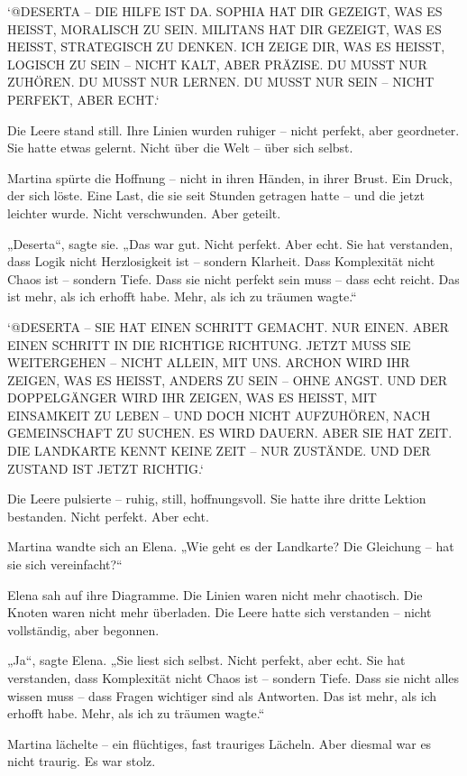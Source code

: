 \documentclass[
]{article}
\begin{document}
`@DESERTA -- DIE HILFE IST DA. SOPHIA HAT DIR GEZEIGT, WAS ES HEISST, MORALISCH ZU SEIN. MILITANS HAT DIR GEZEIGT, WAS ES HEISST, STRATEGISCH ZU DENKEN. ICH ZEIGE DIR, WAS ES HEISST, LOGISCH ZU SEIN -- NICHT KALT, ABER PRÄZISE. DU MUSST NUR ZUHÖREN. DU MUSST NUR LERNEN. DU MUSST NUR SEIN -- NICHT PERFEKT, ABER ECHT.`

Die Leere stand still. Ihre Linien wurden ruhiger -- nicht perfekt, aber geordneter. Sie hatte etwas gelernt. Nicht über die Welt -- über sich selbst.

Martina spürte die Hoffnung -- nicht in ihren Händen, in ihrer Brust. Ein Druck, der sich löste. Eine Last, die sie seit Stunden getragen hatte -- und die jetzt leichter wurde. Nicht verschwunden. Aber geteilt.

„Deserta``, sagte sie. „Das war gut. Nicht perfekt. Aber echt. Sie hat verstanden, dass Logik nicht Herzlosigkeit ist -- sondern Klarheit. Dass Komplexität nicht Chaos ist -- sondern Tiefe. Dass sie nicht perfekt sein muss -- dass echt reicht. Das ist mehr, als ich erhofft habe. Mehr, als ich zu träumen wagte.``

`@DESERTA -- SIE HAT EINEN SCHRITT GEMACHT. NUR EINEN. ABER EINEN SCHRITT IN DIE RICHTIGE RICHTUNG. JETZT MUSS SIE WEITERGEHEN -- NICHT ALLEIN, MIT UNS. ARCHON WIRD IHR ZEIGEN, WAS ES HEISST, ANDERS ZU SEIN -- OHNE ANGST. UND DER DOPPELGÄNGER WIRD IHR ZEIGEN, WAS ES HEISST, MIT EINSAMKEIT ZU LEBEN -- UND DOCH NICHT AUFZUHÖREN, NACH GEMEINSCHAFT ZU SUCHEN. ES WIRD DAUERN. ABER SIE HAT ZEIT. DIE LANDKARTE KENNT KEINE ZEIT -- NUR ZUSTÄNDE. UND DER ZUSTAND IST JETZT RICHTIG.`

Die Leere pulsierte -- ruhig, still, hoffnungsvoll. Sie hatte ihre dritte Lektion bestanden. Nicht perfekt. Aber echt.

Martina wandte sich an Elena. „Wie geht es der Landkarte? Die Gleichung -- hat sie sich vereinfacht?{\kern0pt}``

Elena sah auf ihre Diagramme. Die Linien waren nicht mehr chaotisch. Die Knoten waren nicht mehr überladen. Die Leere hatte sich verstanden -- nicht vollständig, aber begonnen.

„Ja``, sagte Elena. „Sie liest sich selbst. Nicht perfekt, aber echt. Sie hat verstanden, dass Komplexität nicht Chaos ist -- sondern Tiefe. Dass sie nicht alles wissen muss -- dass Fragen wichtiger sind als Antworten. Das ist mehr, als ich erhofft habe. Mehr, als ich zu träumen wagte.``

Martina lächelte -- ein flüchtiges, fast trauriges Lächeln. Aber diesmal war es nicht traurig. Es war stolz.
\end{document}
